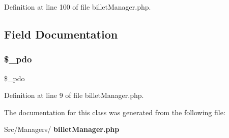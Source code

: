 Definition at line 100 of file billet\+Manager.\+php.



\subsection{Field Documentation}
\mbox{\label{class_src_1_1_managers_1_1billet_manager_a1e6d977917b70dce7e26cebad8438bf4}} 
\subsubsection{\$\+\_\+pdo}
{\footnotesize\ttfamily \$\+\_\+pdo\hspace{0.3cm}{\ttfamily [protected]}}



Definition at line 9 of file billet\+Manager.\+php.



The documentation for this class was generated from the following file\+:\begin{DoxyCompactItemize}
\item 
Src/\+Managers/\textbf{ billet\+Manager.\+php}\end{DoxyCompactItemize}
